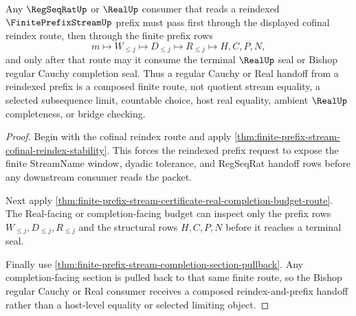 \begin{theorem}
\label{thm:finite-prefix-stream-regular-cauchy-reindex-handoff}
Any $\RegSeqRatUp$ or $\RealUp$ consumer that reads a reindexed $\FinitePrefixStreamUp$ prefix must pass first through the displayed cofinal reindex route, then through the finite prefix rows
$$
m \longmapsto W_{\leq j} \longmapsto D_{\leq j} \longmapsto R_{\leq j} \longmapsto H,C,P,N ,
$$
and only after that route may it consume the terminal $\RealUp$ seal or Bishop regular Cauchy completion seal. Thus a regular Cauchy or Real handoff from a reindexed prefix is a composed finite route, not quotient stream equality, a selected subsequence limit, countable choice, host real equality, ambient $\RealUp$ completeness, or bridge checking.
\end{theorem}
\begin{proof}
Begin with the cofinal reindex route and apply \autoref{thm:finite-prefix-stream-cofinal-reindex-stability}. This forces the reindexed prefix request to expose the finite StreamName window, dyadic tolerance, and RegSeqRat handoff rows before any downstream consumer reads the packet.

Next apply \autoref{thm:finite-prefix-stream-certificate-real-completion-budget-route}. The Real-facing or completion-facing budget can inspect only the prefix rows $W_{\leq j},D_{\leq j},R_{\leq j}$ and the structural rows $H,C,P,N$ before it reaches a terminal seal.

Finally use \autoref{thm:finite-prefix-stream-completion-section-pullback}. Any completion-facing section is pulled back to that same finite route, so the Bishop regular Cauchy or Real consumer receives a composed reindex-and-prefix handoff rather than a host-level equality or selected limiting object.
\end{proof}

